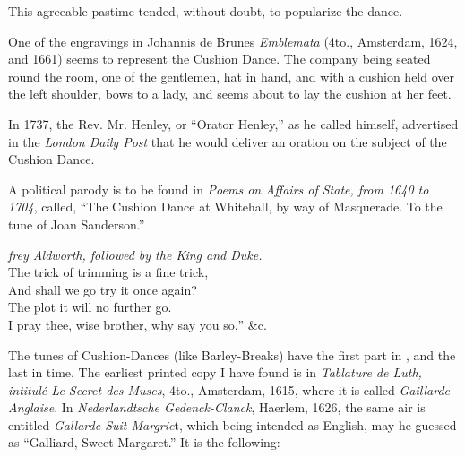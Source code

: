 This agreeable pastime tended, without doubt, to popularize the dance.

One of the engravings in Johannis de Brunes \textit{Emblemata} (4to., Amsterdam,
1624, and 1661) seems to represent the Cushion Dance. The company being
seated round the room, one of the gentlemen, hat in hand, and with a cushion held
over the left shoulder, bows to a lady, and seems about to lay the cushion at her
feet.

In 1737, the Rev. Mr. Henley, or “Orator Henley,” as he called himself,
advertised in the \textit{London Daily Post} that he would deliver an oration on the
subject of the Cushion Dance.

A political parody is to be found in \textit{Poems on Affairs of State, from 1640 to
1704}, called, “The Cushion Dance at Whitehall, by way of Masquerade. To the
tune of Joan Sanderson.”

\settowidth{\versewidth}{The trick of trimming is a fine trick,}
\begin{scverse}
\textit{frey Aldworth, followed by the King and Duke.}\\
The trick of trimming is a fine trick,\\
And shall we go try it once again?\\
The plot it will no further go.\\
I pray thee, wise brother, why say you so,” \&c.
\end{scverse}
\pagebreak

The tunes of Cushion-Dances (like Barley-Breaks) have the first part in
, and the last in  time. The earliest printed copy I have found is in \textit{Tablature
de Luth, intitulé Le Secret des Muses}, 4to., Amsterdam, 1615, where it is
called \textit{Gaillarde Anglaise}. In \textit{Nederlandtsche Gedenck-Clanck}, Haerlem, 1626,
the same air is entitled \textit{Gallarde Suit Margrie}t, which being intended as English,
may he guessed as “Galliard, Sweet Margaret.” It is the following:—



